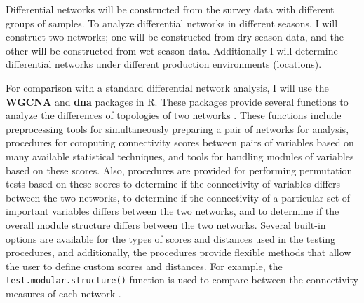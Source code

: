 
Differential networks will be constructed from the survey data with different groups of samples. To analyze differential networks in different seasons, I will construct two networks; one will be constructed from dry season data, and the other will be constructed from wet season data. Additionally I will determine differential networks under different production environments (locations).

For comparison with a standard differential network analysis, I will use the \textbf{WGCNA}  and \textbf{dna}  packages in R. These packages provide several functions to analyze the differences of topologies of two networks . These functions include preprocessing tools for simultaneously preparing a pair of networks for analysis, procedures for computing connectivity scores between pairs of variables based on many available statistical techniques, and tools for handling modules of variables based on these scores. Also, procedures are provided for performing permutation tests based on these scores to determine if the connectivity of variables differs between the two networks, to determine if the connectivity of a particular set of important variables differs between the two networks, and to determine if the overall module structure differs between the two networks. Several built-in options are available for the types of scores and distances used in the testing procedures, and additionally, the procedures provide flexible methods that allow the user to define custom scores and distances. For example, the \texttt{test.modular.structure()} function is used to compare between the connectivity measures of each network . 



 

